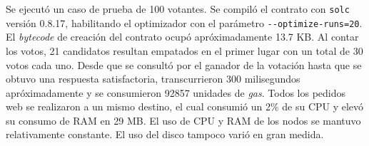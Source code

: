 Se ejecut\'o un caso de prueba de 100 votantes. Se compil\'o el contrato con \texttt{solc} versi\'on 0.8.17, habilitando el optimizador  con el par\'ametro \lstinline{--optimize-runs=20}. 
El \textit{bytecode} de creaci\'on del contrato ocup\'o apr\'oximadamente 13.7 KB.  Al contar los votos,   21 candidatos resultan empatados en el primer lugar con un total de 30 votos cada uno.   Desde que se consult\'o por el ganador de la votaci\'on hasta que se obtuvo una respuesta  satisfactoria, transcurrieron 300 milisegundos apr\'oximadamente y se consumieron 92857 unidades de \textit{gas}.  Todos los pedidos web se realizaron a un mismo destino, el cual consumi\'o un 2\% de su CPU y elev\'o su consumo de RAM en 29 MB. El uso de CPU y RAM de los nodos se mantuvo relativamente constante. El uso del disco tampoco vari\'o en gran medida. 

